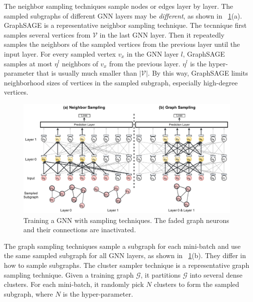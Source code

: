 The neighbor sampling techniques \cite{hamilton2017_graphsage, ying2018_pinsage, chen2018_fastgcn, chen2018_sgcn, huang2018_adap} sample nodes or edges layer by layer.
%
The sampled subgraphs of different GNN layers may be \emph{different}, as shown in \figurename~\ref{fig:gnn_sampling}(a).
%
GraphSAGE \cite{hamilton2017_graphsage} is a representative neighbor sampling technique.
%
The tecnnique first samples several vertices from $\mathcal{V}$ in the last GNN layer.
%
Then it repeatedly samples the neighbors of the sampled vertices from the previous layer until the input layer.
%
For every sampled vertex $v_x$ in the GNN layer $l$, GraphSAGE samples at most $\eta^l$ neighbors of $v_x$ from the previous layer.
%
$\eta^l$ is the hyper-parameter that is usually much smaller than $|\mathcal{V}|$.
%
By this way, GraphSAGE limits neighborhood sizes of vertices in the sampled subgraph, especially high-degree vertices.

\begin{figure}[H]
    \centering
    \includegraphics[width=0.9\columnwidth]{figs/illustration/sampling_techniques.pdf}
    \caption{Training a GNN with sampling techniques. The faded graph neurons and their connections are inactivated.}
    \label{fig:gnn_sampling}
\end{figure}

The graph sampling techniques \cite{zeng2018_aesg, chiang2019_cluster_gcn, zeng2020_graphsaint} sample a subgraph for each mini-batch and use the same sampled subgraph for all GNN layers, as shown in \figurename~\ref{fig:gnn_sampling}(b).
%
They differ in how to sample subgraphs.
%
The cluster sampler technique \cite{chiang2019_cluster_gcn} is a representative graph sampling technique.
%
Given a training graph $\mathcal{G}$, it partitions $\mathcal{G}$ into several dense clusters.
%
For each mini-batch, it randomly pick $N$ clusters to form the sampled subgraph, where $N$ is the hyper-parameter.

